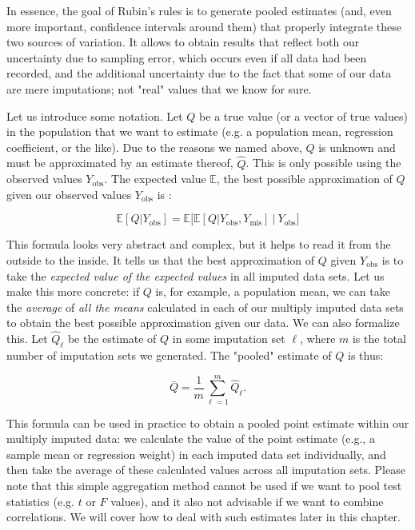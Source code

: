 In essence, the goal of Rubin's rules is to generate pooled estimates (and, even more important, confidence intervals around them) that properly integrate these two sources of variation. It allows to obtain results that reflect both our uncertainty due to sampling error, which occurs even if all data had been recorded, and the additional uncertainty due to the fact that some of our data are mere imputations; not "real" values that we know for sure. 

Let us introduce some notation. Let $Q$ be a true value (or a vector of true values) in the population that we want to estimate (e.g. a population mean, regression coefficient, or the like). Due to the reasons we named above, $Q$ is unknown and must be approximated by an estimate thereof, $\hat{Q}$. This is only possible using the observed values $Y_{\text{obs}}$. The expected value $\mathbb{E}$, the best possible approximation of $Q$ given our observed values $Y_{\text{obs}}$ is \citep[][chap. 2.3.2]{fimd}:

\begin{equation}
\mathbb{E}[Q|Y_{\text{obs}}]=\mathbb{E}\bigg[\mathbb{E}[Q|Y_{\text{obs}}, Y_{\text{mis}}]~\bigg|~Y_{\text{obs}}\bigg]
\end{equation}

This formula looks very abstract and complex, but it helps to read it from the outside to the inside. It tells us that the best approximation of $Q$ given $Y_{\text{obs}}$ is to take the \emph{expected value of the expected values} in all imputed data sets. Let us make this more concrete: if $Q$ is, for example, a population mean, we can take the \emph{average} of \emph{all the means} calculated in each of our multiply imputed data sets to obtain the best possible approximation given our data. We can also formalize this. Let $\hat{Q}_\ell$ be the estimate of $Q$ in some imputation set $\ell$, where $m$ is the total number of imputation sets we generated. The "pooled" estimate of $Q$ is thus:


\begin{equation}
\bar Q = \frac{1}{m}\sum_{\ell=1}^m \hat Q_\ell.
\end{equation}

This formula can be used in practice to obtain a pooled point estimate within our multiply imputed data: we calculate the value of the point estimate (e.g., a sample mean or regression weight) in each imputed data set individually, and then take the average of these calculated values across all imputation sets. Please note that this simple aggregation method cannot be used if we want to pool test statistics (e.g. $t$ or $F$ values), and it also not advisable if we want to combine correlations. We will cover how to deal with such estimates later in this chapter.


